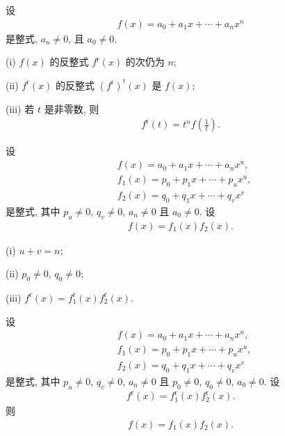 \begin{proposition}
    设
    \begin{align*}
        f(x) = a_0 + a_1 x + \cdots + a_n x^n
    \end{align*}
    是整式, $a_n \neq 0$, 且 $a_0 \neq 0$.

    (i) $f(x)$ 的反整式 $f^{\mathrm{r}} (x)$ 的次仍为 $n$;

    (ii) $f^{\mathrm{r}}(x)$ 的反整式 $(f^{\mathrm{r}})^{\mathrm{r}} (x)$ 是 $f(x)$;

    (iii) 若 $t$ 是非零数, 则
    \begin{align*}
        f^{\mathrm{r}} (t) = t^n f \left( \frac{1}{t} \right).
    \end{align*}
\end{proposition}

\begin{proposition}
    设
    \begin{align*}
         & f(x) = a_0 + a_1 x + \cdots + a_n x^n,    \\
         & f_1 (x) = p_0 + p_1 x + \cdots + p_u x^u, \\
         & f_2 (x) = q_0 + q_1 x + \cdots + q_v x^v
    \end{align*}
    是整式, 其中 $p_u \neq 0$, $q_v \neq 0$, $a_n \neq 0$ 且 $a_0 \neq 0$. 设
    \begin{align*}
        f(x) = f_1 (x) f_2 (x).
    \end{align*}

    (i) $u + v = n$;

    (ii) $p_0 \neq 0$, $q_0 \neq 0$;

    (iii) $f^{\mathrm{r}} (x) = f_1^{\mathrm{r}} (x) f_2^{\mathrm{r}} (x)$.
\end{proposition}

\begin{proposition}
    设
    \begin{align*}
         & f(x) = a_0 + a_1 x + \cdots + a_n x^n,    \\
         & f_1 (x) = p_0 + p_1 x + \cdots + p_u x^u, \\
         & f_2 (x) = q_0 + q_1 x + \cdots + q_v x^v
    \end{align*}
    是整式, 其中 $p_u \neq 0$, $q_v \neq 0$, $a_n \neq 0$ 且 $p_0 \neq 0$, $q_0 \neq 0$, $a_0 \neq 0$. 设
    \begin{align*}
        f^{\mathrm{r}} (x) = f_1^{\mathrm{r}} (x) f_2^{\mathrm{r}} (x).
    \end{align*}
    则
    \begin{align*}
        f(x) = f_1 (x) f_2 (x).
    \end{align*}
\end{proposition}

